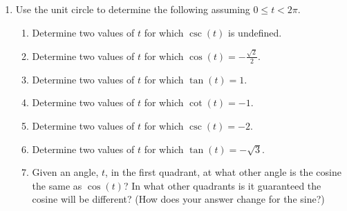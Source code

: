 \begin{enumerate}
  \begin{enumerate}[itemsep=2em]
  \end{enumerate}

\clearpage

\item Use the unit circle to determine the following assuming
  $0\leq t < 2\pi$.
\begin{enumerate}


\item Determine two values of $t$ for which $\csc(t)$ is undefined.
  \vfill

\item Determine two values of $t$ for which $\cos(t)=-\frac{\sqrt{2}}{2}$.
  \vfill

\item Determine two values of $t$ for which $\tan(t)=1$.
  \vfill

\item Determine two values of $t$ for which $\cot(t)=-1$.
  \vfill

\item Determine two values of $t$ for which $\csc(t)=-2$.
  \vfill

\item Determine two values of $t$ for which $\tan(t)=-\sqrt{3}$.
  \vfill

\item Given an angle, $t$, in the first quadrant, at what other angle
  is the cosine the same as $\cos(t)$? 
  In what other quadrants is it guaranteed  the cosine will be different?
  (How does your answer change for the sine?)
  \vfill

\end{enumerate}


\end{enumerate}



